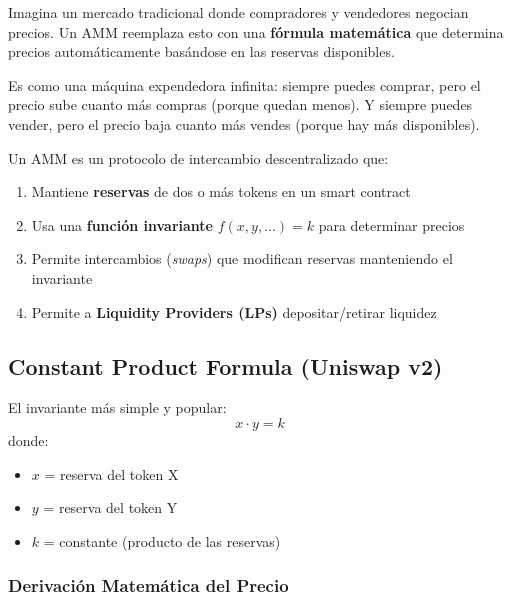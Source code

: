 \documentclass[11pt,a4paper,twoside]{book}
\begin{document}
\begin{intuicion}
Imagina un mercado tradicional donde compradores y vendedores negocian precios. Un AMM reemplaza esto con una \textbf{f\'ormula matem\'atica} que determina precios autom\'aticamente bas\'andose en las reservas disponibles.

Es como una m\'aquina expendedora infinita: siempre puedes comprar, pero el precio sube cuanto m\'as compras (porque quedan menos). Y siempre puedes vender, pero el precio baja cuanto m\'as vendes (porque hay m\'as disponibles).
\end{intuicion}

\begin{definition}
Un AMM es un protocolo de intercambio descentralizado que:
\begin{enumerate}
    \item Mantiene \textbf{reservas} de dos o m\'as tokens en un smart contract
    \item Usa una \textbf{funci\'on invariante} $f(x, y, ...) = k$ para determinar precios
    \item Permite intercambios (\textit{swaps}) que modifican reservas manteniendo el invariante
    \item Permite a \textbf{Liquidity Providers (LPs)} depositar/retirar liquidez
\end{enumerate}
\end{definition}

\subsection{Constant Product Formula (Uniswap v2)}

\begin{definition}
El invariante m\'as simple y popular:
\[
x \cdot y = k
\]
donde:
\begin{itemize}
    \item $x$ = reserva del token X
    \item $y$ = reserva del token Y  
    \item $k$ = constante (producto de las reservas)
\end{itemize}
\end{definition}

\subsubsection{Derivaci\'on Matem\'atica del Precio}
\end{document}
